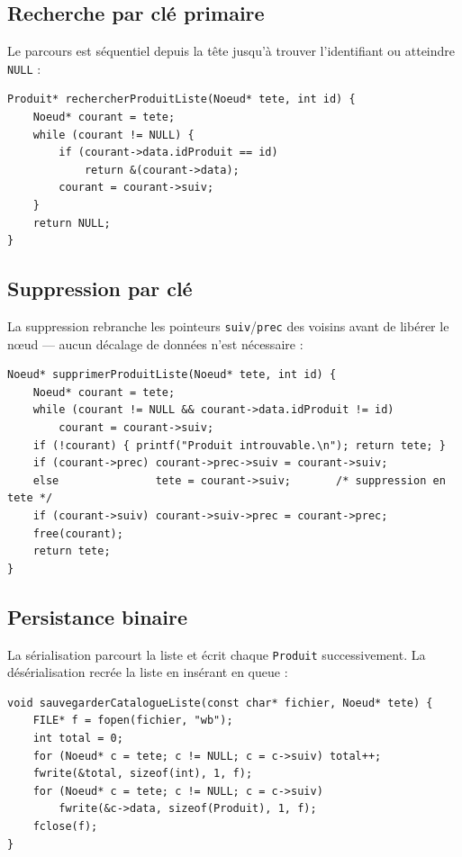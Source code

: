 \documentclass[12pt,a4paper]{report}
\begin{document}
\subsection{Recherche par clé primaire}

Le parcours est séquentiel depuis la tête jusqu'à trouver l'identifiant ou atteindre \texttt{NULL} :

\begin{lstlisting}[caption={Recherche par clé dans la liste}, label=lst:rech_liste]
Produit* rechercherProduitListe(Noeud* tete, int id) {
    Noeud* courant = tete;
    while (courant != NULL) {
        if (courant->data.idProduit == id)
            return &(courant->data);
        courant = courant->suiv;
    }
    return NULL;
}
\end{lstlisting}

\subsection{Suppression par clé}

La suppression rebranche les pointeurs \texttt{suiv}/\texttt{prec} des voisins avant de libérer le nœud — aucun décalage de données n'est nécessaire :

\begin{lstlisting}[caption={Suppression par clé dans la liste}, label=lst:suppr_liste]
Noeud* supprimerProduitListe(Noeud* tete, int id) {
    Noeud* courant = tete;
    while (courant != NULL && courant->data.idProduit != id)
        courant = courant->suiv;
    if (!courant) { printf("Produit introuvable.\n"); return tete; }
    if (courant->prec) courant->prec->suiv = courant->suiv;
    else               tete = courant->suiv;       /* suppression en tete */
    if (courant->suiv) courant->suiv->prec = courant->prec;
    free(courant);
    return tete;
}
\end{lstlisting}

\subsection{Persistance binaire}

La sérialisation parcourt la liste et écrit chaque \texttt{Produit} successivement. La désérialisation recrée la liste en insérant en queue :

\begin{lstlisting}[caption={Sérialisation binaire de la liste chaînée}]
void sauvegarderCatalogueListe(const char* fichier, Noeud* tete) {
    FILE* f = fopen(fichier, "wb");
    int total = 0;
    for (Noeud* c = tete; c != NULL; c = c->suiv) total++;
    fwrite(&total, sizeof(int), 1, f);
    for (Noeud* c = tete; c != NULL; c = c->suiv)
        fwrite(&c->data, sizeof(Produit), 1, f);
    fclose(f);
}
\end{lstlisting}
\end{document}

